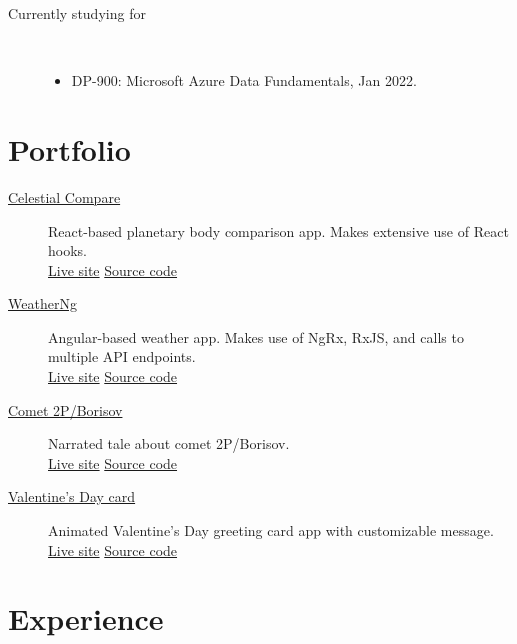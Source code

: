 \documentclass{article}
\begin{document}
\begin{description}
  \item [Currently studying for] ~
  \begin{itemize}
    \item DP-900: Microsoft Azure Data Fundamentals, Jan 2022.
  \end{itemize} 
\end{description}

\vspace{-0.5em}
\section*{Portfolio}\vspace{-0.5em}

\begin{description}
  \item[\href{https://sirkoik.github.io/Celestial-Compare}{Celestial Compare}] React-based planetary body comparison app. Makes extensive use of React hooks.\\ \href{https://sirkoik.github.io/Celestial-Compare}{Live site} \textcolor{gray}{\textbullet} \href{https://github.com/sirkoik/Celestial-Compare}{Source code}
  \item[\href{https://sirkoik.github.io/WeatherNg}{WeatherNg}] Angular-based weather app. Makes use of NgRx, RxJS, and calls to multiple API endpoints.\\ \href{https://sirkoik.github.io/WeatherNg}{Live site} \textcolor{gray}{\textbullet} \href{https://github.com/sirkoik/WeatherNg}{Source code}
  \item[\href{https://sirkoik.github.io/BorisovXmas}{Comet 2P/Borisov}] Narrated tale about comet 2P/Borisov.\\ \href{https://sirkoik.github.io/BorisovXmas}{Live site} \textcolor{gray}{\textbullet} \href{https://github.com/sirkoik/BorisovXmas}{Source code}
  \item[\href{https://sirkoik.github.io/February}{Valentine's Day card}] Animated Valentine's Day greeting card app with customizable message.\\
   \href{https://sirkoik.github.io/February}{Live site} \textcolor{gray}{\textbullet} \href{https://github.com/sirkoik/February}{Source code}
\end{description}

\vspace{-1em}
\section*{Experience}\vspace{-0.5em}
\end{document}
